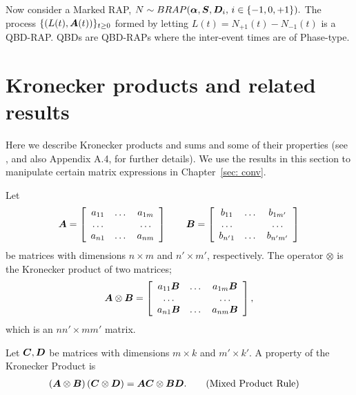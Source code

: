 Now consider a Marked RAP, \(N\sim BRAP(\boldsymbol \alpha, \boldsymbol S, \boldsymbol D_i,\,i\in\{-1,0,+1\}).\) The process \(\{(L(t),\boldsymbol A(t))\}_{t\geq0}\) formed by letting \(L(t) = N_{+1}(t) - N_{-1}(t)\) is a QBD-RAP. QBDs are QBD-RAPs where the inter-event times are of Phase-type.


\section{Kronecker products and related results}
Here we describe Kronecker products and sums and some of their properties (see \cite{MEinAP}, and also Appendix A.4, for further details). We use the results in this section to manipulate certain matrix expressions in Chapter~\ref{sec: conv}.

Let 
\[\boldsymbol A = \left[\begin{array}{ccc}a_{11} & \dots & a_{1m}\\\hdots & & \hdots \\ a_{n1}&\dots & a_{nm}\end{array}\right]
\qquad
\boldsymbol{B} = \left[\begin{array}{ccc}b_{11} & \dots & b_{1m'}\\\hdots & & \hdots \\ b_{n'1}&\dots & b_{n'm'}\end{array}\right]\]
be matrices with dimensions \(n\times m\) and \(n'\times m'\), respectively. The operator \(\otimes\) is the Kronecker product of two matrices; 
\[\boldsymbol A\otimes \boldsymbol{B} = \left[\begin{array}{ccc}a_{11}\boldsymbol{B} & \dots & a_{1m}\boldsymbol{B}\\\hdots & & \hdots \\ a_{n1}\boldsymbol{B}&\dots & a_{nm}\boldsymbol{B}\end{array}\right],\]
which is an \(nn'\times mm'\) matrix. 

Let \(\boldsymbol{C},\boldsymbol{D}\)  be matrices with dimensions \(m\times k\) and \(m'\times k'\). A property of the Kronecker Product is 
\begin{align}
	\left(\boldsymbol A\otimes \boldsymbol{B}\right)\left(\boldsymbol{C}\otimes \boldsymbol{D}\right) &= \boldsymbol A\boldsymbol{C}\otimes \boldsymbol{B}\boldsymbol{D}.\label{eqn:mpr}\tag{Mixed Product Rule}
\end{align}


